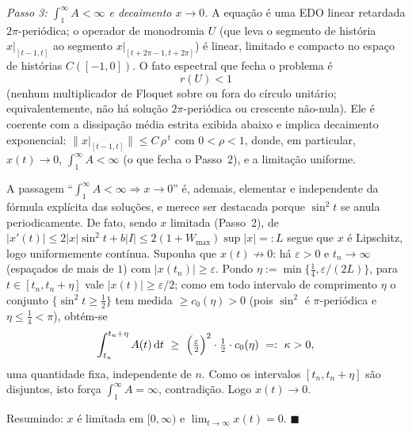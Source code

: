 \emph{Passo 3: $\int_1^\infty A<\infty$ e decaimento $x\to0$.}
A equação é uma EDO linear retardada $2\pi$-periódica; o operador de monodromia $U$ (que leva o segmento de história $x|_{[t-1,t]}$ ao segmento $x|_{[t+2\pi-1,t+2\pi]}$) é linear, limitado e compacto no espaço de histórias $C([-1,0])$. O fato espectral que fecha o problema é
\[
r(U)<1
\]
(nenhum multiplicador de Floquet sobre ou fora do círculo unitário; equivalentemente, não há solução $2\pi$-periódica ou crescente não-nula). Ele é coerente com a dissipação média estrita exibida abaixo e implica decaimento exponencial: $\|x|_{[t-1,t]}\|\le C\,\rho^{\,t}$ com $0<\rho<1$, donde, em particular, $x(t)\to0$, $\int_1^\infty A<\infty$ (o que fecha o Passo~2), e a limitação uniforme.

A passagem ``$\int_1^\infty A<\infty\Rightarrow x\to0$'' é, ademais, elementar e independente da fórmula explícita das soluções, e merece ser destacada porque $\sin^2 t$ se anula periodicamente. De fato, sendo $x$ limitada (Passo~2), de $|x'(t)|\le 2|x|\sin^2 t+b|I|\le 2(1+W_{\max})\sup|x|=:L$ segue que $x$ é Lipschitz, logo uniformemente contínua. Suponha que $x(t)\not\to0$: há $\varepsilon>0$ e $t_n\to\infty$ (espaçados de mais de $1$) com $|x(t_n)|\ge\varepsilon$. Pondo $\eta:=\min\{\tfrac14,\varepsilon/(2L)\}$, para $t\in[t_n,t_n+\eta]$ vale $|x(t)|\ge\varepsilon/2$; como em todo intervalo de comprimento $\eta$ o conjunto $\{\sin^2 t\ge\tfrac12\}$ tem medida $\ge c_0(\eta)>0$ (pois $\sin^2$ é $\pi$-periódica e $\eta\le\tfrac14<\pi$), obtém-se
\[
\int_{t_n}^{t_n+\eta}A(t)\,\d t\ \ge\ \Big(\tfrac\varepsilon2\Big)^2\cdot\tfrac12\cdot c_0(\eta)\ =:\ \kappa>0,
\]
uma quantidade fixa, independente de $n$. Como os intervalos $[t_n,t_n+\eta]$ são disjuntos, isto força $\int_1^\infty A=\infty$, contradição. Logo $x(t)\to0$.

Resumindo: $x$ é limitada em $[0,\infty)$ e $\lim_{t\to\infty}x(t)=0$. \qquad$\blacksquare$


